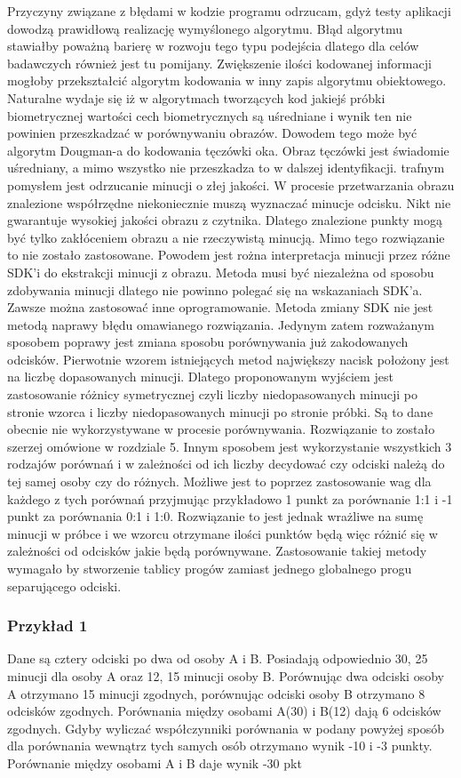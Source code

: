 Przyczyny związane z błędami w kodzie programu odrzucam, gdyż testy aplikacji dowodzą prawidłową realizację wymyślonego algorytmu. Błąd algorytmu stawiałby poważną barierę w rozwoju tego typu podejścia dlatego dla celów badawczych również jest tu pomijany. Zwiększenie ilości kodowanej informacji mogłoby przekształcić algorytm kodowania w inny zapis algorytmu obiektowego. Naturalne wydaje się iż w algorytmach tworzących kod jakiejś próbki biometrycznej wartości cech biometrycznych są uśredniane i wynik ten nie powinien przeszkadzać w porównywaniu obrazów. Dowodem tego może być algorytm Dougman-a do kodowania tęczówki oka. Obraz tęczówki jest świadomie uśredniany, a mimo wszystko nie przeszkadza to w dalszej identyfikacji. trafnym pomysłem jest odrzucanie minucji o złej jakości. W procesie przetwarzania obrazu znalezione współrzędne niekoniecznie muszą wyznaczać minucje odcisku. Nikt nie gwarantuje wysokiej jakości obrazu z czytnika. Dlatego znalezione punkty mogą być tylko zakłóceniem obrazu a nie rzeczywistą minucją. Mimo tego rozwiązanie to nie zostało zastosowane. Powodem jest rożna interpretacja minucji przez różne SDK'i do ekstrakcji minucji z obrazu. Metoda musi być  niezależna od sposobu zdobywania minucji dlatego nie powinno polegać się na wskazaniach SDK'a. Zawsze można zastosować inne oprogramowanie. Metoda zmiany SDK nie jest metodą naprawy błędu omawianego rozwiązania. Jedynym zatem rozważanym sposobem poprawy jest zmiana sposobu porównywania już zakodowanych odcisków. Pierwotnie wzorem istniejących metod największy nacisk położony jest na liczbę dopasowanych minucji. Dlatego proponowanym wyjściem jest zastosowanie różnicy symetrycznej czyli liczby niedopasowanych minucji po stronie wzorca i liczby niedopasowanych minucji po stronie próbki. Są to dane obecnie nie wykorzystywane w procesie porównywania. Rozwiązanie to zostało szerzej omówione w rozdziale 5. Innym sposobem jest wykorzystanie wszystkich 3 rodzajów porównań i w zależności od ich liczby decydować czy odciski należą do tej samej osoby czy do różnych. Możliwe jest to poprzez zastosowanie wag dla każdego z tych porównań przyjmując przykładowo 1 punkt za porównanie 1:1 i -1 punkt za porównania 0:1 i 1:0. Rozwiązanie to jest jednak wrażliwe na sumę minucji w próbce i we wzorcu otrzymane ilości punktów będą więc różnić się w zależności od odcisków jakie będą porównywane. Zastosowanie takiej metody wymagało by stworzenie tablicy progów zamiast jednego globalnego progu separującego odciski.
\subsubsection{Przykład 1}
Dane są cztery odciski po dwa od osoby A i B. Posiadają odpowiednio 30, 25 minucji dla osoby A oraz 12, 15 minucji osoby B. Porównując dwa odciski osoby A otrzymano 15 minucji zgodnych, porównując odciski osoby B otrzymano 8 odcisków zgodnych. Porównania między osobami A(30) i B(12) dają 6 odcisków zgodnych. Gdyby wyliczać współczynniki porównania w podany powyżej sposób dla porównania wewnątrz tych samych osób otrzymano wynik -10 i -3 punkty. Porównanie między osobami A i B daje wynik -30 pkt

